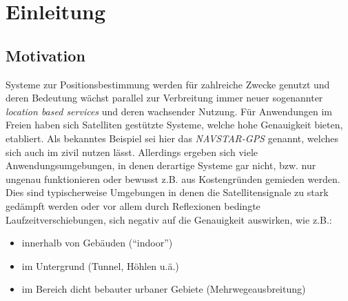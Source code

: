 \chapter{Einleitung}
\label{cha:einleitung}

\section{Motivation}
\label{sec:motivation}

Systeme zur Positionsbestimmung werden für zahlreiche Zwecke genutzt und deren
Bedeutung wächst parallel zur Verbreitung immer neuer sogenannter
\textit{location based services} und deren wachsender Nutzung.  Für Anwendungen
im Freien haben sich Satelliten gestützte Systeme, welche hohe Genauigkeit
bieten, etabliert.  Als bekanntes Beispiel sei hier das \textit{NAVSTAR-GPS}
genannt, welches sich auch im zivil nutzen lässt.  Allerdings ergeben sich
viele Anwendungsumgebungen, in denen derartige Systeme gar nicht, bzw.  nur
ungenau funktionieren oder bewusst z.B. aus Kostengründen gemieden werden.
Dies sind typischerweise Umgebungen in denen die Satellitensignale zu stark
gedämpft werden oder vor allem durch Reflexionen bedingte
Laufzeitverschiebungen, sich negativ auf die Genauigkeit auswirken, wie z.B.: 


\begin{itemize} 
  \item innerhalb von Gebäuden (``indoor'') 
  \item im Untergrund (Tunnel, Höhlen u.ä.) 
  \item im Bereich dicht bebauter urbaner Gebiete
    (Mehrwegeausbreitung) \end{itemize}

